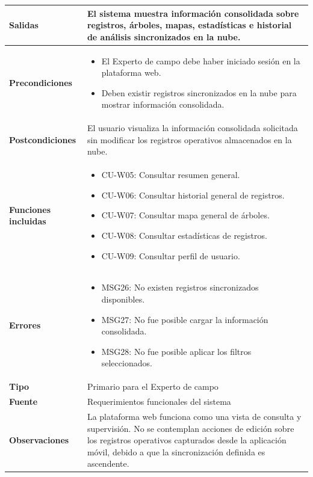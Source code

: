 \begin{longtable}{|p{3.3cm}|p{10cm}|}
\textbf{Salidas} & 
El sistema muestra información consolidada sobre registros, árboles, mapas, estadísticas e historial de análisis sincronizados en la nube. \\ \hline

\textbf{Precondiciones} & 
\begin{itemize}
    \item El Experto de campo debe haber iniciado sesión en la plataforma web.
    \item Deben existir registros sincronizados en la nube para mostrar información consolidada.
\end{itemize} \\ \hline

\textbf{Postcondiciones} & 
El usuario visualiza la información consolidada solicitada sin modificar los registros operativos almacenados en la nube. \\ \hline

\textbf{Funciones incluidas} &
\begin{itemize}
    \item CU-W05: Consultar resumen general.
    \item CU-W06: Consultar historial general de registros.
    \item CU-W07: Consultar mapa general de árboles.
    \item CU-W08: Consultar estadísticas de registros.
    \item CU-W09: Consultar perfil de usuario.
\end{itemize} \\ \hline

\textbf{Errores} & 
\begin{itemize}
    \item MSG26: No existen registros sincronizados disponibles.
    \item MSG27: No fue posible cargar la información consolidada.
    \item MSG28: No fue posible aplicar los filtros seleccionados.
\end{itemize} \\ \hline

\textbf{Tipo} & Primario para el Experto de campo \\ \hline

\textbf{Fuente} & Requerimientos funcionales del sistema \\ \hline

\textbf{Observaciones} & 
La plataforma web funciona como una vista de consulta y supervisión. No se contemplan acciones de edición sobre los registros operativos capturados desde la aplicación móvil, debido a que la sincronización definida es ascendente. \\ \hline

\end{longtable}

